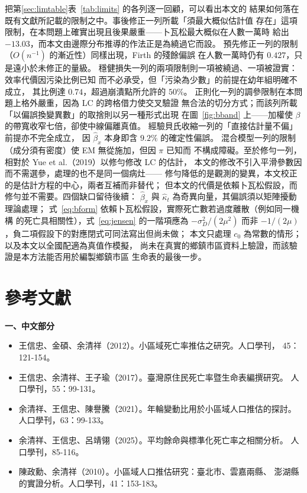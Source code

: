 \documentclass[UTF8, fontset=macnew, a4paper, 12pt]{ctexart}
\begin{document}
把第\ref{sec:limtable}表~\ref{tab:limits} 的各列逐一回顧，可以看出本文的
結果如何落在既有文獻所記載的限制之中。事後修正一列所載「須最大概似估計值
存在」這項限制，在本問題上確實出現且後果嚴重——卜瓦松最大概似在人數一萬時
給出 $-13.03$，而本文由邊際分布推導的作法正是為繞過它而設。
預先修正一列的限制（$O(n^{-1})$ 的漸近性）同樣出現，Firth 的殘餘偏誤
在人數一萬時仍有 $0.427$，只是遠小於未修正的量級。
穩健損失一列的兩項限制則一項被繞過、一項被證實：效率代價因污染比例已知
而不必承受，但「污染為少數」的前提在幼年組明確不成立，
其比例達 $0.74$，超過崩潰點所允許的 $50\%$。
正則化一列的調參限制在本問題上格外嚴重，因為 LC 的跨格借力使交叉驗證
無合法的切分方式；而該列所載「以偏誤換變異數」的取捨則以另一種形式出現
在圖~\ref{fig:bband} 上——加權使 $\beta$ 的帶寬收窄七倍，卻使中線偏離真值。
經驗貝氏收縮一列的「直接估計量不偏」前提亦不完全成立，
因 $\hat\beta_x$ 本身即含 $9.2\%$ 的確定性偏誤。
混合模型一列的限制（成分須有密度）使 EM 無從施加，但因 $\pi$ 已知而
不構成障礙。至於修勻一列，相對於 Yue et al.（2019）以修勻修改 LC 的估計，
本文的修改不引入平滑參數因而不需選參，處理的也不是同一個病灶——
修勻降低的是觀測的變異，本文校正的是估計方程的中心，兩者互補而非替代；
但本文的代價是依賴卜瓦松假設，而修勻並不需要。四個缺口留待後續：
$\hat\beta_x$ 與 $\hat\kappa_t$ 為奇異向量，其偏誤須以矩陣擾動理論處理；
式~\eqref{eq:bform} 依賴卜瓦松假設，實際死亡數若過度離散（例如同一機構
的死亡具相關性），式~\eqref{eq:jensen} 的一階項應為 $-\sigma_D^2/(2\mu^2)$
而非 $-1/(2\mu)$，負二項假設下的對應閉式可同法寫出但尚未做；
本文只處理 $c_0$ 為常數的情形；以及本文以全國配適為真值作模擬，
尚未在真實的鄉鎮市區資料上驗證，而該驗證是本方法能否用於編製鄉鎮市區
生命表的最後一步。

\section*{參考文獻}

\noindent\textbf{一、中文部分}
\begin{itemize}[leftmargin=2em, label={}, itemsep=3pt]
  \item[] 王信忠、金碩、余清祥（2012）。小區域死亡率推估之研究。人口學刊，
        45：121-154。
  \item[] 王信忠、余清祥、王子瑜（2017）。臺灣原住民死亡率暨生命表編撰研究。
        人口學刊，55：99-131。
  \item[] 余清祥、王信忠、陳譽騰（2021）。年輪變動比用於小區域人口推估的探討。
        人口學刊，63：99-133。
  \item[] 余清祥、王信忠、呂靖翎（2025）。平均餘命與標準化死亡率之相關分析。
        人口學刊，85-116。
  \item[] 陳政勳、余清祥（2010）。小區域人口推估研究：臺北市、雲嘉兩縣、
        澎湖縣的實證分析。人口學刊，41：153-183。
\end{itemize}
\end{document}
